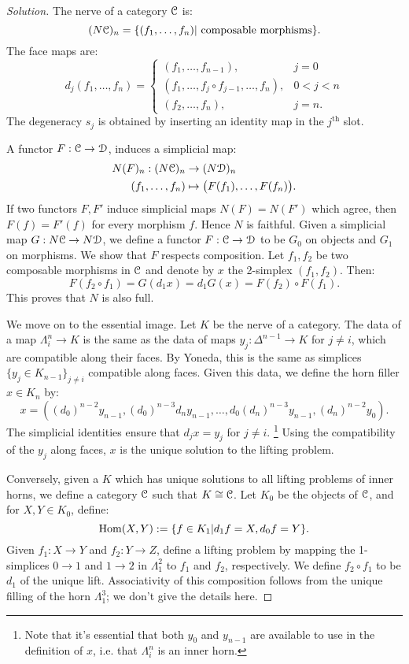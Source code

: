 \documentclass[10pt,a4paper,reqno,oneside]{book} %
\theoremstyle{plain}
\theoremstyle{definition}
\theoremstyle{remark}
\numberwithin{equation}{section}
\begin{document}
\ifpersonal
\begin{proof}[Solution]
The nerve of a category $\mathcal C$ is:
\[	(N\mathcal C)_n = \{ (f_1, \dots, f_n) | \text{ composable morphisms} \}.	\]
The face maps are:
\[	d_j (f_1, \dots, f_n) = \left\{ \begin{array} {ll}
(f_1, \dots, f_{n-1}), & j=0 \\
(f_1, \dots, f_j \circ f_{j-1}, \dots, f_n), & 0<j<n \\
(f_2, \dots, f_n), & j=n.
\end{array} \right.	\]
The degeneracy $s_j$ is obtained by inserting an identity map in the $j^{\text{th}}$ slot.

A functor $F : \mathcal C \to \mathcal D$, induces a simplicial map:
\begin{align*}
N(F)_n : (N\mathcal C)_n &\to (N\mathcal D)_n \\
(f_1, \dots, f_n) &\mapsto \big(F(f_1), \dots, F(f_n)\big).
\end{align*}
If two functors $F, F'$ induce simplicial maps $N(F) = N(F')$ which agree, then $F(f) = F'(f)$ for every morphism $f$. Hence
$N$ is faithful. Given a simplicial map $G : N\mathcal C \to N\mathcal D$, we define a functor $F : \mathcal C \to \mathcal D$ to be $G_0$ on objects
and $G_1$ on morphisms. We show that $F$ respects composition. Let $f_1, f_2$ be two composable morphisms in $\mathcal C$ and denote by $x$
the 2-simplex $(f_1, f_2)$. Then:
\[	F(f_2 \circ f_1) = G(d_1 x) = d_1 G(x) = F(f_2) \circ F(f_1).	\]
This proves that $N$ is also full.

We move on to the essential image. Let $K$ be the nerve of a category. The data of a map $\Lambda^n_i \to K$ is the same
as the data of maps $y_j : \Delta^{n-1} \to K$ for $j\neq i$, which are compatible along their faces. By Yoneda, this is the
same as simplices $\{y_j \in K_{n-1} \}_{j\neq i}$ compatible along faces. Given this data, we define the horn filler
$x \in K_n$ by:
\[	x = \left( (d_0)^{n-2}y_{n-1}, (d_0)^{n-3}d_n y_{n-1}, \dots, d_0(d_n)^{n-3}y_{n-1}, (d_n)^{n-2} y_0 \right).	\]
The simplicial identities ensure that $d_j x = y_j$ for $j \neq i$. \footnote{Note that it's essential that both $y_0$ and $y_{n-1}$
	are available to use in the definition of $x$, i.e. that $\Lambda^n_i$ is an inner horn.} Using the compatibility
of the $y_j$ along faces, $x$ is the unique solution to the lifting problem.

Conversely, given a $K$ which has unique solutions to all lifting problems of inner horns, we define a category $\mathcal C$ such
that $K \cong \mathcal C$. Let $K_0$ be the objects of $\mathcal C$, and for $X,Y \in K_0$, define:
\[	\operatorname{Hom}(X,Y) := \{f \in K_1 | d_1f = X, d_0f = Y \}.	\]
Given $f_1 : X \to Y$ and $f_2 : Y \to Z$, define a lifting problem by mapping the 1-simplices $0 \to 1$ and $1\to 2$ in
$\Lambda^2_1$ to $f_1$ and $f_2$, respectively. We define $f_2 \circ f_1$ to be $d_1$ of the unique lift. Associativity
of this composition follows from the unique filling of the horn $\Lambda^3_1$; we don't give the details here.	
\end{proof}
\fi
\end{document}
